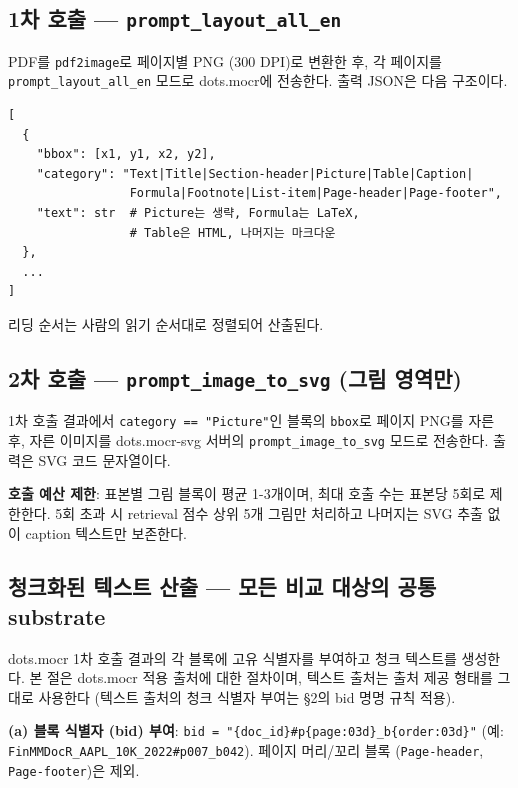 \documentclass[11pt]{article}
\begin{document}
\subsection{1차 호출 — \texttt{prompt\_layout\_all\_en}}

PDF를 \texttt{pdf2image}로 페이지별 PNG (300 DPI)로 변환한 후, 각 페이지를 \texttt{prompt\_layout\_all\_en} 모드로 dots.mocr에 전송한다. 출력 JSON은 다음 구조이다.

\begin{tcolorbox}[colback=gray!5,colframe=gray!50,title=dots.mocr 페이지 출력 (1차 호출)]
\small
\begin{verbatim}
[
  {
    "bbox": [x1, y1, x2, y2],
    "category": "Text|Title|Section-header|Picture|Table|Caption|
                 Formula|Footnote|List-item|Page-header|Page-footer",
    "text": str  # Picture는 생략, Formula는 LaTeX,
                 # Table은 HTML, 나머지는 마크다운
  },
  ...
]
\end{verbatim}
\end{tcolorbox}

리딩 순서는 사람의 읽기 순서대로 정렬되어 산출된다.

\subsection{2차 호출 — \texttt{prompt\_image\_to\_svg} (그림 영역만)}

1차 호출 결과에서 \texttt{category == "Picture"}인 블록의 \texttt{bbox}로 페이지 PNG를 자른 후, 자른 이미지를 dots.mocr-svg 서버의 \texttt{prompt\_image\_to\_svg} 모드로 전송한다. 출력은 SVG 코드 문자열이다.

\textbf{호출 예산 제한}: 표본별 그림 블록이 평균 1-3개이며, 최대 호출 수는 표본당 5회로 제한한다. 5회 초과 시 retrieval 점수 상위 5개 그림만 처리하고 나머지는 SVG 추출 없이 caption 텍스트만 보존한다.

\subsection{청크화된 텍스트 산출 — 모든 비교 대상의 공통 substrate}
\label{sec:layer1}

dots.mocr 1차 호출 결과의 각 블록에 고유 식별자를 부여하고 청크 텍스트를 생성한다. 본 절은 dots.mocr 적용 출처에 대한 절차이며, 텍스트 출처는 출처 제공 형태를 그대로 사용한다 (텍스트 출처의 청크 식별자 부여는 \S 2의 bid 명명 규칙 적용).

\textbf{(a) 블록 식별자 (bid) 부여}: \texttt{bid = "\{doc\_id\}\#p\{page:03d\}\_b\{order:03d\}"} (예: \texttt{FinMMDocR\_AAPL\_10K\_2022\#p007\_b042}). 페이지 머리/꼬리 블록 (\texttt{Page-header}, \texttt{Page-footer})은 제외.
\end{document}
